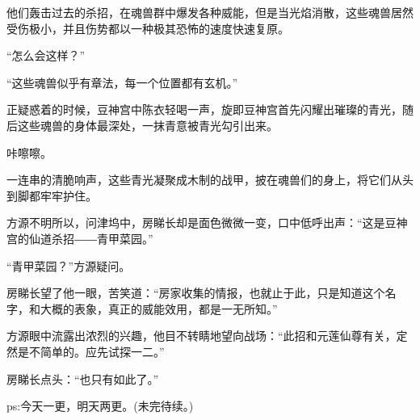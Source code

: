 \begin{this_body}
他们轰击过去的杀招，在魂兽群中爆发各种威能，但是当光焰消散，这些魂兽居然受伤极小，并且伤势都以一种极其恐怖的速度快速复原。

“怎么会这样？”

“这些魂兽似乎有章法，每一个位置都有玄机。”

正疑惑着的时候，豆神宫中陈衣轻喝一声，旋即豆神宫首先闪耀出璀璨的青光，随后这些魂兽的身体最深处，一抹青意被青光勾引出来。

咔嚓嚓。

一连串的清脆响声，这些青光凝聚成木制的战甲，披在魂兽们的身上，将它们从头到脚都牢牢护住。

方源不明所以，问津坞中，房睇长却是面色微微一变，口中低呼出声：“这是豆神宫的仙道杀招――青甲菜园。”

“青甲菜园？”方源疑问。

房睇长望了他一眼，苦笑道：“房家收集的情报，也就止于此，只是知道这个名字，和大概的表象，真正的威能效用，都是一无所知。”

方源眼中流露出浓烈的兴趣，他目不转睛地望向战场：“此招和元莲仙尊有关，定然是不简单的。应先试探一二。”

房睇长点头：“也只有如此了。”

ps:今天一更，明天两更。(未完待续。)

\end{this_body}

